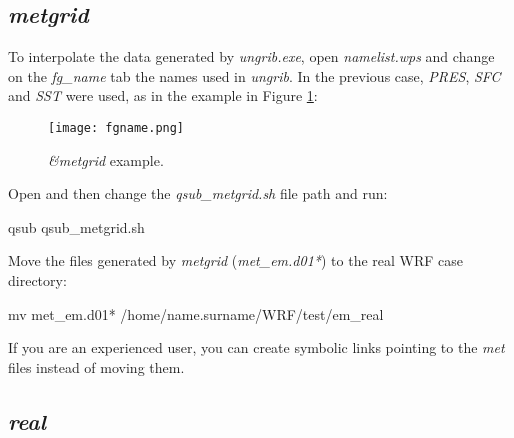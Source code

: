 \subsection{\textit{metgrid}}\label{metgridsecao}
\bigskip
\noindent To interpolate the data generated by \textit{ungrib.exe}, open \textit{namelist.wps} and change on the \textit{fg\_name} tab the 
names used in \textit {ungrib}. In the previous case, \textit {PRES}, \textit{SFC} and \textit{SST} were used, as in the example in 
Figure \textcolor{bleu_cite}{\ref{fgname}}:
\bigskip

\begin{figure}[H]
    \centering
    \texttt{[image: fgname.png]}
    \caption{\textit{\&metgrid} example.}
    \label{fgname}
\end{figure}
\bigskip

\noindent Open and then change the \textit{qsub\_metgrid.sh} file path and run:
\bigskip

\begin{bashcode}
qsub qsub_metgrid.sh
\end{bashcode}
\bigskip

\noindent Move the files generated by \textit{metgrid} (\textit {met\_em.d01*}) to the real WRF case directory:
\bigskip

\begin{bashcode}
 mv met_em.d01* /home/name.surname/WRF/test/em_real
\end{bashcode}
\bigskip


\begin{tcolorbox}[enhanced,
    grow to left by=0cm,%
    grow to right by=0cm,%
    enlarge top by=0cm,%
    enlarge bottom by=0cm,%
    tcbox raise base,
    boxrule=1.0pt,
    left=18mm,
    colframe=red!50!black,coltext=red!25!black,colback=red!10!white,
    overlay={\begin{tcbclipinterior}\fill[red!75!blue!50!white] (frame.south west)
      rectangle node[text=white,font=\sffamily\bfseries\footnotesize,rotate=0] {WARNING} ([xshift=18mm]frame.north west);\end{tcbclipinterior}}]
If you are an experienced user, you can create symbolic links pointing to the \textit{met} files instead of moving them.
  \end{tcolorbox}
  \bigskip

\subsection{\textit{real}}\label{realsecao}
\bigskip

